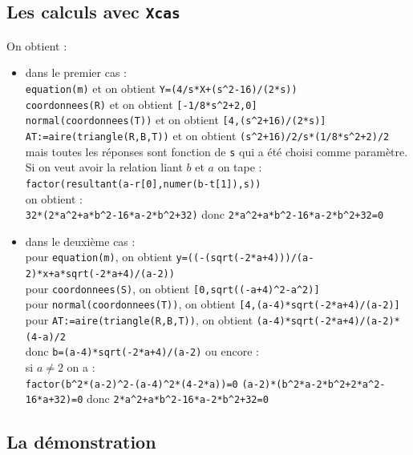 \documentclass[a4paper,11pt]{book}
\begin{document}
\subsection{Les calculs avec {\tt Xcas}}
 On obtient :\\
\begin{itemize}
\item dans le premier cas :\\
{\tt equation(m)} et on obtient {\tt Y=(4/s*X+(s\verb|^|2-16)/(2*s))}\\
{\tt coordonnees(R)} et on obtient {\tt [-1/8*s\verb|^|2+2,0]}\\
{\tt normal(coordonnees(T))} et on obtient {\tt [4,(s\verb|^|2+16)/(2*s)]}\\
{\tt AT:=aire(triangle(R,B,T))} et on obtient {\tt (s\verb|^|2+16)/2/s*(1/8*s\verb|^|2+2)/2}\\
mais toutes les r\'eponses sont fonction de {\tt s} qui a \'et\'e choisi comme 
param\`etre.\\
Si on veut avoir la relation liant $b$ et $a$ on tape :\\
{\tt factor(resultant(a-r[0],numer(b-t[1]),s))} \\
on obtient :\\
{\tt 32*(2*a\verb|^|2+a*b\verb|^|2-16*a-2*b\verb|^|2+32)}
donc {\tt 2*a\verb|^|2+a*b\verb|^|2-16*a-2*b\verb|^|2+32=0}
\item dans le deuxi\`eme cas :\\
pour {\tt equation(m)}, on obtient {\tt y=((-(sqrt(-2*a+4)))/(a-2)*x+a*sqrt(-2*a+4)/(a-2))}\\
pour {\tt coordonnees(S)}, on obtient {\tt [0,sqrt((-a+4)\verb|^|2-a\verb|^|2)]}\\
pour {\tt normal(coordonnees(T))}, on obtient 
{\tt [4,(a-4)*sqrt(-2*a+4)/(a-2)]}\\
pour {\tt AT:=aire(triangle(R,B,T))}, on obtient 
{\tt (a-4)*sqrt(-2*a+4)/(a-2)*(4-a)/2}\\
donc {\tt b=(a-4)*sqrt(-2*a+4)/(a-2)} ou encore :\\
si $a\neq 2$ on a :\\
{\tt factor(b\verb|^|2*(a-2)\verb|^|2-(a-4)\verb|^|2*(4-2*a))=0} 
{\tt (a-2)*(b\verb|^|2*a-2*b\verb|^|2+2*a\verb|^|2-16*a+32)=0}
donc {\tt 2*a\verb|^|2+a*b\verb|^|2-16*a-2*b\verb|^|2+32=0}
\end{itemize}
\subsection{La d\'emonstration}
\end{document}
